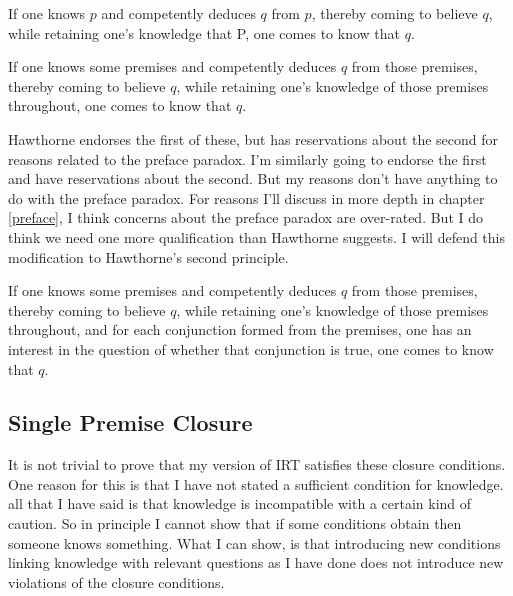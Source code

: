 \documentclass[11pt,]{book}
\providecommand{\tightlist}{%
  \setlength{\itemsep}{0pt}\setlength{\parskip}{0pt}}
\begin{document}
\begin{description}
\tightlist
\item[Single Premise Closure]
If one knows \(p\) and competently deduces \(q\) from \(p\), thereby coming to believe \(q\), while retaining one's knowledge that P, one comes to know that \(q\). \citep[43]{Hawthorne2005}
\item[Multiple Premise Closure]
If one knows some premises and competently deduces \(q\) from those premises, thereby coming to believe \(q\), while retaining one's knowledge of those premises throughout, one comes to know that \(q\). \citep[43]{Hawthorne2005}
\end{description}

Hawthorne endorses the first of these, but has reservations about the second for reasons related to the preface paradox. I'm similarly going to endorse the first and have reservations about the second. But my reasons don't have anything to do with the preface paradox. For reasons I'll discuss in more depth in chapter \ref{preface}, I think concerns about the preface paradox are over-rated. But I do think we need one more qualification than Hawthorne suggests. I will defend this modification to Hawthorne's second principle.

\begin{description}
\tightlist
\item[Relevant Multiple Premise Closure]
If one knows some premises and competently deduces \(q\) from those premises, thereby coming to believe \(q\), while retaining one's knowledge of those premises throughout, and for each conjunction formed from the premises, one has an interest in the question of whether that conjunction is true, one comes to know that \(q\).
\end{description}

\hypertarget{andelim}{%
\subsection{Single Premise Closure}\label{andelim}}

It is not trivial to prove that my version of IRT satisfies these closure conditions. One reason for this is that I have not stated a sufficient condition for knowledge. all that I have said is that knowledge is incompatible with a certain kind of caution. So in principle I cannot show that if some conditions obtain then someone knows something. What I can show, is that introducing new conditions linking knowledge with relevant questions as I have done does not introduce new violations of the closure conditions.
\end{document}
